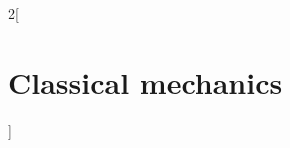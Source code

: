 \documentclass[../../../main_physics.tex]{subfiles}
\begin{document}
\begin{multicols}{2}[\section{Classical mechanics}]

\end{multicols}
\end{document}

